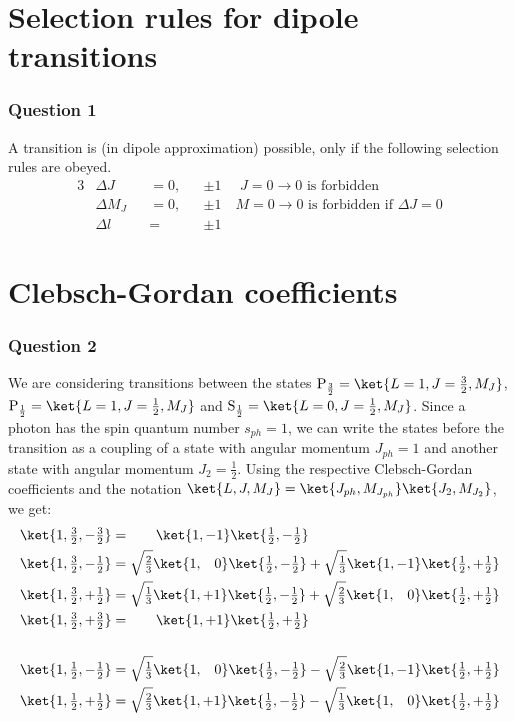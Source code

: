 
\section{Selection rules for dipole transitions}  
\subsubsection{Question 1}
A transition is (in dipole approximation) possible, only if the following selection rules are obeyed.
\begin{alignat}{3}
	&\Delta J&&=0,&&\pm1 \quad \,\,\text{$J=0\to 0$ is forbidden}\\
	&\Delta M_J&&=0,&&\pm1 \quad \text{$M=0\to 0$ is forbidden if $\Delta J=0$}\\
	&\Delta l &&= &&\pm1
\end{alignat}
\section{Clebsch-Gordan coefficients}
\subsubsection{Question 2}
We are considering transitions between the states $\mathrm P_\frac{3}{2}=\ket{L=1,J=\frac{3}{2}, M_J}$, $\mathrm P_\frac{1}{2}=\ket{L=1,J=\frac{1}{2}, M_J}$ and $\mathrm S_\frac{1}{2}=\ket{L=0,J=\frac{1}{2}, M_J}$. 
Since a photon has the spin quantum number $s_{ph}=1$, we can write the states before the transition as a coupling of a state with angular momentum $J_{ph}=1$ and another state with angular momentum $J_2=\frac{1}{2}$. 
Using the respective Clebsch-Gordan coefficients and the notation $\ket{L,J,M_J}=\ket{J_{ph},M_{J_{ph}}}\ket{J_2,M_{J_2}}$, we get:
\begin{align}
	\ket{1,\tfrac{3}{2},-\tfrac{3}{2}}&=\quad \;\;\; \ket{1,-1}\ket{\tfrac{1}{2},-\tfrac{1}{2}}\\
	\ket{1,\tfrac{3}{2},-\tfrac{1}{2}}&=\sqrt{\tfrac{2}{3}}\ket{1,\;\;\;0}\ket{\tfrac{1}{2},-\tfrac{1}{2}}+\sqrt{\tfrac{1}{3}}\ket{1,-1}\ket{\tfrac{1}{2},+\tfrac{1}{2}}\\
	\ket{1,\tfrac{3}{2},+\tfrac{1}{2}}&=\sqrt{\tfrac{1}{3}}\ket{1,+1}\ket{\tfrac{1}{2},-\tfrac{1}{2}}+\sqrt{\tfrac{2}{3}}\ket{1,\;\;\; 0}\ket{\tfrac{1}{2},+\tfrac{1}{2}}\\
	\ket{1,\tfrac{3}{2},+\tfrac{3}{2}}&=\quad \;\;\; \ket{1,+1}\ket{\tfrac{1}{2},+\tfrac{1}{2}}\\
	\nonumber\\
	\ket{1,\tfrac{1}{2},-\tfrac{1}{2}}&=\sqrt{\tfrac{1}{3}}\ket{1,\;\;\;0}\ket{\tfrac{1}{2},-\tfrac{1}{2}}-\sqrt{\tfrac{2}{3}}\ket{1,-1}\ket{\tfrac{1}{2},+\tfrac{1}{2}}\\
	\ket{1,\tfrac{1}{2},+\tfrac{1}{2}}&=\sqrt{\tfrac{2}{3}}\ket{1,+1}\ket{\tfrac{1}{2},-\tfrac{1}{2}}-\sqrt{\tfrac{1}{3}}\ket{1,\;\;\; 0}\ket{\tfrac{1}{2},+\tfrac{1}{2}}
\end{align}
